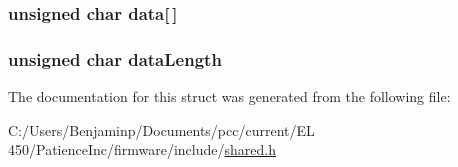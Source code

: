 \subsubsection[{data}]{\setlength{\rightskip}{0pt plus 5cm}unsigned char data\mbox{[}$\,$\mbox{]}}\label{structi2c_packet_ad22557485286d9df959ff3335001ce69}
\hypertarget{structi2c_packet_ab75048efd066658a4bd4e95b916f7f91}{}
\subsubsection[{data\+Length}]{\setlength{\rightskip}{0pt plus 5cm}unsigned char data\+Length}\label{structi2c_packet_ab75048efd066658a4bd4e95b916f7f91}


The documentation for this struct was generated from the following file\+:\begin{DoxyCompactItemize}
\item 
C\+:/\+Users/\+Benjaminp/\+Documents/pcc/current/\+E\+L 450/\+Patience\+Inc/firmware/include/\hyperlink{shared_8h}{shared.\+h}\end{DoxyCompactItemize}
